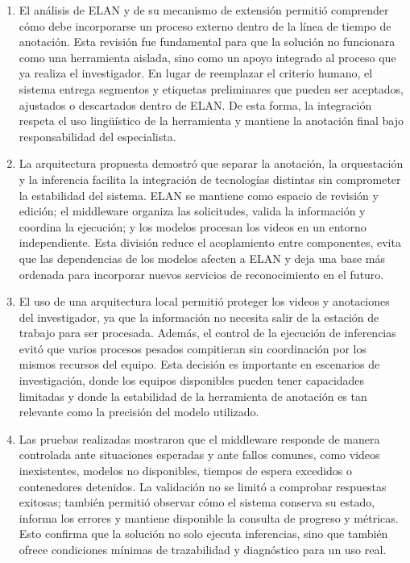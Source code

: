 \begin{enumerate}
    \item El análisis de ELAN y de su mecanismo de extensión permitió comprender cómo debe incorporarse un proceso externo dentro de la línea de tiempo de anotación. Esta revisión fue fundamental para que la solución no funcionara como una herramienta aislada, sino como un apoyo integrado al proceso que ya realiza el investigador. En lugar de reemplazar el criterio humano, el sistema entrega segmentos y etiquetas preliminares que pueden ser aceptados, ajustados o descartados dentro de ELAN. De esta forma, la integración respeta el uso lingüístico de la herramienta y mantiene la anotación final bajo responsabilidad del especialista.

    \item La arquitectura propuesta demostró que separar la anotación, la orquestación y la inferencia facilita la integración de tecnologías distintas sin comprometer la estabilidad del sistema. ELAN se mantiene como espacio de revisión y edición; el middleware organiza las solicitudes, valida la información y coordina la ejecución; y los modelos procesan los videos en un entorno independiente. Esta división reduce el acoplamiento entre componentes, evita que las dependencias de los modelos afecten a ELAN y deja una base más ordenada para incorporar nuevos servicios de reconocimiento en el futuro.

    \item El uso de una arquitectura local permitió proteger los videos y anotaciones del investigador, ya que la información no necesita salir de la estación de trabajo para ser procesada. Además, el control de la ejecución de inferencias evitó que varios procesos pesados compitieran sin coordinación por los mismos recursos del equipo. Esta decisión es importante en escenarios de investigación, donde los equipos disponibles pueden tener capacidades limitadas y donde la estabilidad de la herramienta de anotación es tan relevante como la precisión del modelo utilizado.

    \item Las pruebas realizadas mostraron que el middleware responde de manera controlada ante situaciones esperadas y ante fallos comunes, como videos inexistentes, modelos no disponibles, tiempos de espera excedidos o contenedores detenidos. La validación no se limitó a comprobar respuestas exitosas; también permitió observar cómo el sistema conserva su estado, informa los errores y mantiene disponible la consulta de progreso y métricas. Esto confirma que la solución no solo ejecuta inferencias, sino que también ofrece condiciones mínimas de trazabilidad y diagnóstico para un uso real.


\end{enumerate}
